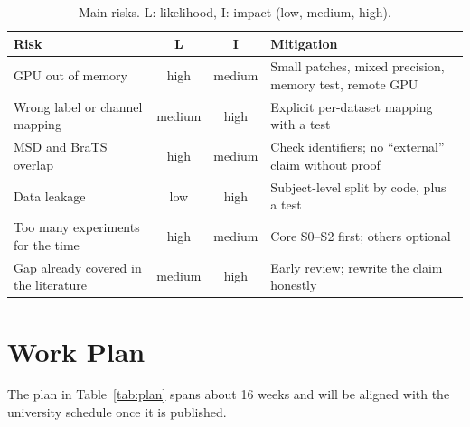 \documentclass[11pt,a4paper]{article}
\begin{document}
\begin{table}[ht]
\centering\small
\caption{Main risks. L: likelihood, I: impact (low, medium, high).}
\label{tab:risk}
\begin{tabularx}{\linewidth}{@{}>{\raggedright\arraybackslash}p{3.7cm}ccX@{}}
\toprule
\rowcolor{accentlight}\textbf{Risk} & \textbf{L} & \textbf{I} & \textbf{Mitigation} \\
\midrule
GPU out of memory & high & medium & Small patches, mixed precision, memory test, remote GPU \\
Wrong label or channel mapping & medium & high & Explicit per-dataset mapping with a test \\
MSD and BraTS overlap & high & medium & Check identifiers; no ``external'' claim without proof \\
Data leakage & low & high & Subject-level split by code, plus a test \\
Too many experiments for the time & high & medium & Core S0--S2 first; others optional \\
Gap already covered in the literature & medium & high & Early review; rewrite the claim honestly \\
\bottomrule
\end{tabularx}
\end{table}

\section{Work Plan}
The plan in Table~\ref{tab:plan} spans about 16 weeks and will be aligned with the university schedule once it is published.
\end{document}
